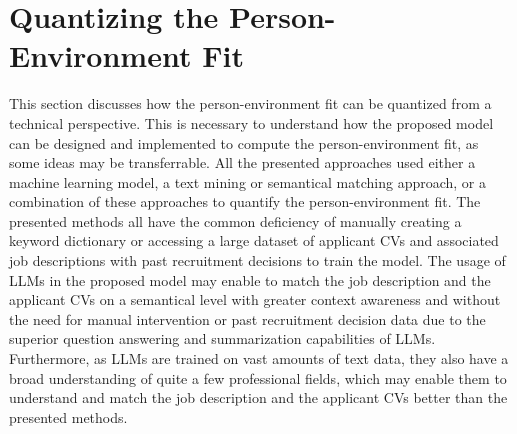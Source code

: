 \documentclass[draft,final]{thesisclass} %
\begin{document}
\section{Quantizing the Person-Environment Fit}
This section discusses how the person-environment fit can be quantized from a technical perspective.
This is necessary to understand how the proposed model can be designed and implemented to compute the person-environment fit, as some ideas may be transferrable.
All the presented approaches used either a machine learning model, a text mining or semantical matching approach, or a combination of these approaches to quantify the person-environment fit.
The presented methods all have the common deficiency of manually creating a keyword dictionary or accessing a large dataset of applicant \acs{CV}s and associated job descriptions with past recruitment decisions to train the model.
The usage of \gls{LLM}s in the proposed model may enable to match the job description and the applicant \acs{CV}s on a semantical level with greater context awareness and without the need for manual intervention or past recruitment decision data due to the superior question answering and summarization capabilities of \gls{LLM}s.
Furthermore, as \gls{LLM}s are trained on vast amounts of text data, they also have a broad understanding of quite a few professional fields, which may enable them to understand and match the job description and the applicant \acs{CV}s better than the presented methods.
\end{document}
